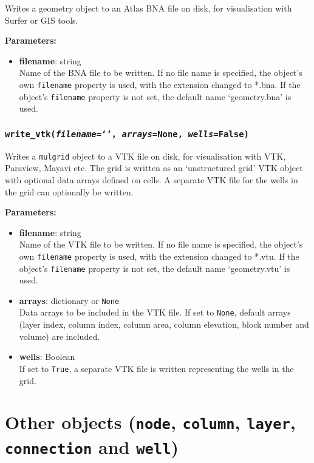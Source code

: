 Writes a geometry object to an Atlas BNA file on disk, for visualisation with Surfer or GIS tools.

\textbf{Parameters:}
\begin{itemize}
\item \textbf{filename}: string\\
  Name of the BNA file to be written.  If no file name is specified, the object's own \texttt{filename} property is used, with the extension changed to *.bna.  If the object's \texttt{filename} property is not set, the default name `geometry.bna' is used.
\end{itemize}

\subsubsection{\texttt{write\_vtk(\emph{filename}=`', \emph{arrays}=None, \emph{wells}=False)}}

Writes a \texttt{mulgrid} object to a VTK file on disk, for visualisation with VTK, Paraview, Mayavi etc.  The grid is written as an `unstructured grid' VTK object with optional data arrays defined on cells.  A separate VTK file for the wells in the grid can optionally be written.

\textbf{Parameters:}
\begin{itemize}
\item \textbf{filename}: string\\
  Name of the VTK file to be written.  If no file name is specified, the object's own \texttt{filename} property is used, with the extension changed to *.vtu.  If the object's \texttt{filename} property is not set, the default name `geometry.vtu' is used.
\item \textbf{arrays}: dictionary or \texttt{None}\\
  Data arrays to be included in the VTK file.  If set to \texttt{None}, default arrays (layer index, column index, column area, column elevation, block number and volume) are included.
\item \textbf{wells}: Boolean\\
  If set to \texttt{True}, a separate VTK file is written representing the wells in the grid.
\end{itemize}

\section{Other objects (\texttt{node}, \texttt{column}, \texttt{layer}, \texttt{connection} and \texttt{well})}
\label{other_mulgrid_objects}

